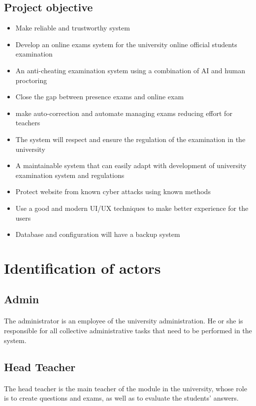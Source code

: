 \documentclass[]{uc2pfecaneva}
\begin{document}
\subsection{Project objective}
\begin{itemize}
	\item Make reliable and trustworthy system
	\item Develop an online exams system for the university online official students examination
	\item An anti-cheating examination system using a combination of AI and human proctoring
	\item Close the gap between presence exams and online exam
	\item make auto-correction and automate managing exams reducing effort for teachers
	\item The system will respect and ensure the regulation of the examination in the university
	\item A maintainable system that can easily adapt  with development of university examination system and regulations
	\item Protect website from known cyber attacks using known methods
	\item Use a good and modern UI/UX techniques to make better experience for the users
	\item Database and configuration will have a backup system
\end{itemize}


\raggedright\section{Identification of actors}
\raggedright\subsection{Admin}
\paragraph{}
	The administrator is an employee of the university administration. He or she is responsible for all collective administrative tasks that need to be performed in the system.

\raggedright\subsection{Head Teacher}
\paragraph{}
	The head teacher is the main teacher of the module in the university, whose role is to create questions and exams, as well as to evaluate the students' answers.
\end{document}
